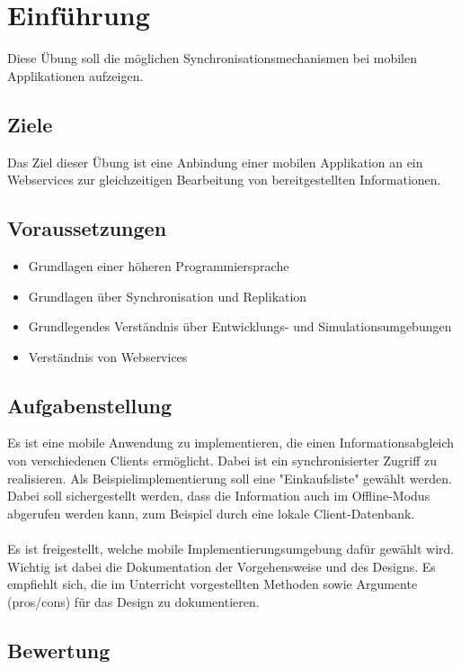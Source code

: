 
\section{Einführung}
Diese Übung soll die möglichen Synchronisationsmechanismen bei mobilen Applikationen aufzeigen.

\subsection{Ziele}
Das Ziel dieser Übung ist eine Anbindung einer mobilen Applikation an ein Webservices zur gleichzeitigen Bearbeitung von bereitgestellten Informationen.

\subsection{Voraussetzungen}

\begin{itemize}
	\item Grundlagen einer höheren Programmiersprache
	\item Grundlagen über Synchronisation und Replikation
	\item Grundlegendes Verständnis über Entwicklungs- und Simulationsumgebungen
	\item Verständnis von Webservices
\end{itemize}

\subsection{Aufgabenstellung}

Es ist eine mobile Anwendung zu implementieren, die einen Informationsabgleich von verschiedenen Clients ermöglicht. Dabei ist ein synchronisierter Zugriff zu realisieren. Als Beispielimplementierung soll eine "Einkaufsliste" gewählt werden. Dabei soll sichergestellt werden, dass die Information auch im Offline-Modus abgerufen werden kann, zum Beispiel durch eine lokale Client-Datenbank.
\\\\
Es ist freigestellt, welche mobile Implementierungsumgebung dafür gewählt wird. Wichtig ist dabei die Dokumentation der Vorgehensweise und des Designs. Es empfiehlt sich, die im Unterricht vorgestellten Methoden sowie Argumente (pros/cons) für das Design zu dokumentieren.

\subsection{Bewertung}

